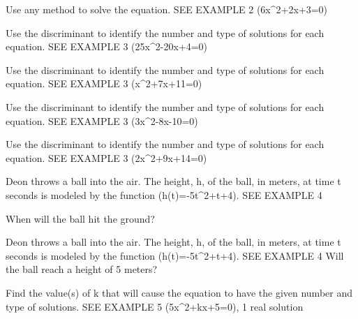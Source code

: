 \documentclass{article}
\newenvironment{practice}[2]{}{}        %
\newcommand{\answer}[1]{}               %
\newcommand{\placeholder}[2]{}          %
\begin{document}
\begin{practice}{25}{1}
Use any method to solve the equation. SEE EXAMPLE 2
(6x^2+2x+3=0)
\answer{(x=-\frac{1}{6}\pm\frac{\sqrt{17}}{6}i)}
\end{practice}
\begin{practice}{26}{1}
Use the discriminant to identify the number and type of solutions for each equation. SEE EXAMPLE 3
(25x^2-20x+4=0)
\answer{1 real solution}
\end{practice}
\begin{practice}{27}{1}
Use the discriminant to identify the number and type of solutions for each equation. SEE EXAMPLE 3
(x^2+7x+11=0)
\answer{2 real solutions}
\end{practice}
\begin{practice}{28}{1}
Use the discriminant to identify the number and type of solutions for each equation. SEE EXAMPLE 3
(3x^2-8x-10=0)
\answer{2 real solutions}
\end{practice}
\begin{practice}{29}{1}
Use the discriminant to identify the number and type of solutions for each equation. SEE EXAMPLE 3
(2x^2+9x+14=0)
\answer{2 non-real solutions}
\end{practice}
\begin{practice}{30}{1}
Deon throws a ball into the air. The height, h, of the ball, in meters, at time t seconds is modeled by the function (h(t)=-5t^2+t+4). SEE EXAMPLE 4
\placeholder{graph}{Orange downward parabola for (h(t)=-5t^2+t+4) on axes labeled x and y, vertex near (0.1,4.05), zeros -0.8 and 1, y-intercept 4; grid window x=[-3,3], y=[-2,5], unit spacing; labeled x=-2,O,2 and y=2,4; axes arrowed and curve ends arrowed downward.}
When will the ball hit the ground?
\answer{After 1 second}
\end{practice}
\begin{practice}{31}{1}
Deon throws a ball into the air. The height, h, of the ball, in meters, at time t seconds is modeled by the function (h(t)=-5t^2+t+4). SEE EXAMPLE 4
Will the ball reach a height of 5 meters?
\answer{No; when written in standard form, (-5t^2+t-1=0), the discriminant is negative, so there are no real solutions. The ball will not reach a height of 5 meters.}
\end{practice}
\begin{practice}{32}{1}
Find the value(s) of k that will cause the equation to have the given number and type of solutions. SEE EXAMPLE 5
(5x^2+kx+5=0), 1 real solution
\answer{(k=\pm10)}
\end{practice}
\end{document}

